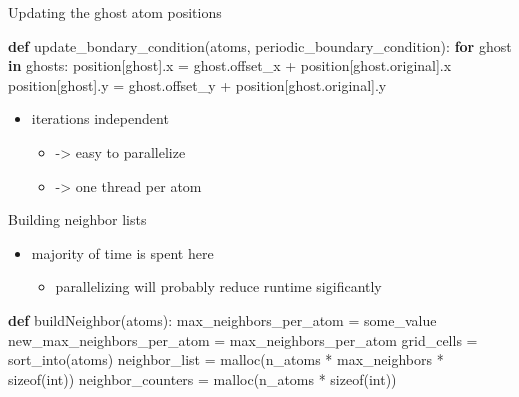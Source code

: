 \documentclass[ignorenonframetext,]{beamer}
\newenvironment{Shaded}{}{}
\newcommand{\BuiltInTok}[1]{#1}
\newcommand{\ControlFlowTok}[1]{\textcolor[rgb]{0.00,0.44,0.13}{\textbf{#1}}}
\newcommand{\KeywordTok}[1]{\textcolor[rgb]{0.00,0.44,0.13}{\textbf{#1}}}
\newcommand{\NormalTok}[1]{#1}
\newcommand{\OperatorTok}[1]{\textcolor[rgb]{0.40,0.40,0.40}{#1}}
\providecommand{\tightlist}{%
  \setlength{\itemsep}{0pt}\setlength{\parskip}{0pt}}
\begin{document}
\begin{frame}[fragile]

\begin{block}{Updating the ghost atom positions}

\begin{Shaded}
\begin{Highlighting}[]
\KeywordTok{def}\NormalTok{ update_bondary_condition(atoms, periodic_boundary_condition):}
  \ControlFlowTok{for}\NormalTok{ ghost }\KeywordTok{in}\NormalTok{ ghosts:}
\NormalTok{    position[ghost].x }\OperatorTok{=}\NormalTok{ ghost.offset_x }\OperatorTok{+}\NormalTok{ position[ghost.original].x}
\NormalTok{    position[ghost].y }\OperatorTok{=}\NormalTok{ ghost.offset_y }\OperatorTok{+}\NormalTok{ position[ghost.original].y}
\end{Highlighting}
\end{Shaded}

\begin{itemize}
\tightlist
\item
  iterations independent

  \begin{itemize}
  \tightlist
  \item
    -\textgreater{} easy to parallelize
  \item
    -\textgreater{} one thread per atom
  \end{itemize}
\end{itemize}

\end{block}

\begin{block}{Building neighbor lists}

\begin{itemize}
\tightlist
\item
  majority of time is spent here

  \begin{itemize}
  \tightlist
  \item
    parallelizing will probably reduce runtime sigificantly
  \end{itemize}
\end{itemize}

\begin{Shaded}
\begin{Highlighting}[]
\KeywordTok{def}\NormalTok{ buildNeighbor(atoms):}
\NormalTok{  max_neighbors_per_atom }\OperatorTok{=}\NormalTok{ some_value}
\NormalTok{  new_max_neighbors_per_atom }\OperatorTok{=}\NormalTok{ max_neighbors_per_atom}
\NormalTok{  grid_cells }\OperatorTok{=}\NormalTok{ sort_into(atoms)}
\NormalTok{  neighbor_list }\OperatorTok{=}\NormalTok{ malloc(n_atoms }\OperatorTok{*}\NormalTok{ max_neighbors }\OperatorTok{*}\NormalTok{ sizeof(}\BuiltInTok{int}\NormalTok{))}
\NormalTok{  neighbor_counters }\OperatorTok{=}\NormalTok{ malloc(n_atoms }\OperatorTok{*}\NormalTok{ sizeof(}\BuiltInTok{int}\NormalTok{))}
  

\end{Highlighting}
\end{Shaded}
\end{block}
\end{frame}
\end{document}
